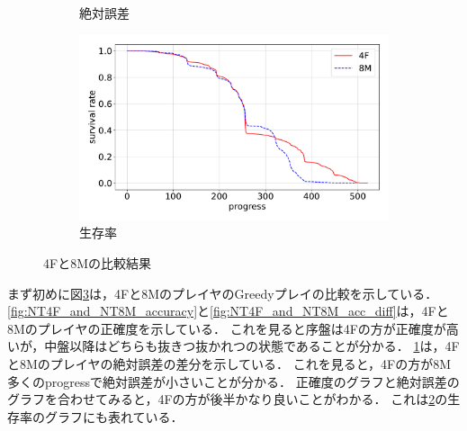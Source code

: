 \begin{figure}[t]
\begin{subfigure}[b]{0.8\linewidth}
    \caption{絶対誤差}
    \label{fig:NT4F_and_NT8M_error_abs_diff}
\end{subfigure}
\begin{subfigure}[b]{0.8\linewidth}
    \includegraphics[width=\linewidth]{pdf/compare/NT4F_and_NT8M/survival.pdf}
    \caption{生存率}
    \label{fig:NT4F_and_NT8M_survival}
\end{subfigure}
\caption{4Fと8Mの比較結果}
\label{fig:NT4F_and_NT8M_results}
\end{figure}

まず初めに図\ref{fig:NT4F_and_NT8M_results}は，4Fと8MのプレイヤのGreedyプレイの比較を示している．
\ref{fig:NT4F_and_NT8M_accuracy}と\ref{fig:NT4F_and_NT8M_acc_diff}は，4Fと8Mのプレイヤの正確度を示している．
これを見ると序盤は4Fの方が正確度が高いが，中盤以降はどちらも抜きつ抜かれつの状態であることが分かる．
\ref{fig:NT4F_and_NT8M_error_abs_diff}は，4Fと8Mのプレイヤの絶対誤差の差分を示している．
これを見ると，4Fの方が8M多くのprogressで絶対誤差が小さいことが分かる．
正確度のグラフと絶対誤差のグラフを合わせてみると，4Fの方が後半かなり良いことがわかる．
これは\ref{fig:NT4F_and_NT8M_survival}の生存率のグラフにも表れている．

